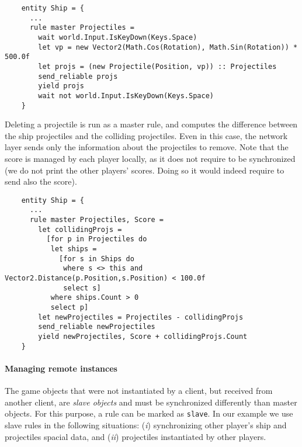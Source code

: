 \begin{enumerate}[(i)]
	\begin{lstlisting}
	entity Ship = {
	  ...
	  rule master Projectiles =
	    wait world.Input.IsKeyDown(Keys.Space)
	    let vp = new Vector2(Math.Cos(Rotation), Math.Sin(Rotation)) * 500.0f
	    let projs = (new Projectile(Position, vp)) :: Projectiles
	    send_reliable projs
	    yield projs
	    wait not world.Input.IsKeyDown(Keys.Space)
	}
	\end{lstlisting}
	
	Deleting a projectile is run as a master rule, and computes the difference between the ship projectiles and the colliding projectiles. Even in this case, the network layer sends only the information about the projectiles to remove. Note that the score is managed by each player locally, as it does not require to be synchronized (we do not print the other players' scores. Doing so it would indeed require to send also the score).
	
	\begin{lstlisting}
	entity Ship = {
	  ...
	  rule master Projectiles, Score =
	    let collidingProjs =
	      [for p in Projectiles do
	       let ships =
	         [for s in Ships do
	          where s <> this and Vector2.Distance(p.Position,s.Position) < 100.0f
	          select s]
	       where ships.Count > 0
	       select p]
	    let newProjectiles = Projectiles - collidingProjs
	    send_reliable newProjectiles
	    yield newProjectiles, Score + collidingProjs.Count
	}
	\end{lstlisting}
\end{enumerate}

\paragraph{Managing remote instances}
The game objects that were not instantiated by a client, but received from another client, are \textit{slave objects} and must be synchronized differently than master objects. For this purpose, a rule can be marked as \texttt{slave}. In our example we use slave rules in the following situations: (\textit{i}) synchronizing other player's ship and projectiles spacial data, and (\textit{ii}) projectiles instantiated by other players.


